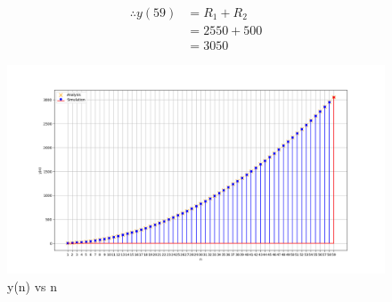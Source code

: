 \documentclass[journal,12pt,twocolumn]{IEEEtran}
\begin{document}
	\begin{align}
		\therefore y(59)&= R_1 + R_2 \\
		 &= 2550 + 500\\
		 &= 3050
	\end{align}
	\begin{figure}[ht]
		\includegraphics[width = \columnwidth]{ncert-maths/11/9/5/5/figs/fig1}
		\caption{y(n) vs n}
		\centering
		\label{fig: fig1}
	\end{figure}
\end{document}
